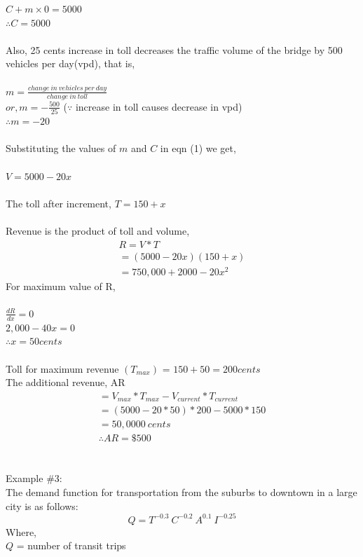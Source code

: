 $ C + m \times 0 = 5000 $\\
$ \therefore C = 5000 $\\\\
Also, 25 cents increase in toll decreases the traffic volume of the bridge by 500 vehicles per day(vpd), that is,\\\\
$ m = \frac{change \:in \:vehicles\: per\: day}{change\: in\: toll} $\\
$ or, m = - \frac{500}{25} $ ($ \because $ increase in toll causes decrease in vpd)\\
$  \therefore m = -20 $\\\\
Substituting the values of $ m $ and $ C $ in eqn (1) we get,\\\\
$ V = 5000 - 20x $\\\\
The toll after increment, $T = 150 + x$\\\\
Revenue is the product of toll and volume,
\begin{gather*}
	R = V * T\\
	= (5000 - 20x)(150 + x)\\
	= 750,000 + 2000 - 20x^2
\end{gather*}
For maximum value of R,\\\\
$\frac{dR}{dx} = 0$\\
$2,000 -40x = 0$\\
$\therefore x = 50 cents$\\\\
Toll for maximum revenue $ (T_{max}) $ = $150 +50 = 200cents$\\
The additional revenue, AR
\begin{gather*}
	= V_{max} *  T_{max} - V_{current} * T_{current}\\
	= (5000 - 20 * 50) * 200 - 5000 * 150\\
	= 50,0000\: cents\\
	\therefore AR =\$500
\end{gather*}\\\\
Example \#3:\\
The demand function for transportation from the suburbs to downtown in a large city is as follows:
$$ Q = T^{-0.3}\: C^{-0.2} \: A^{0.1} \: I^{-0.25} $$
Where,\\
\hspace*{10mm} $Q$ = number of transit trips\\
